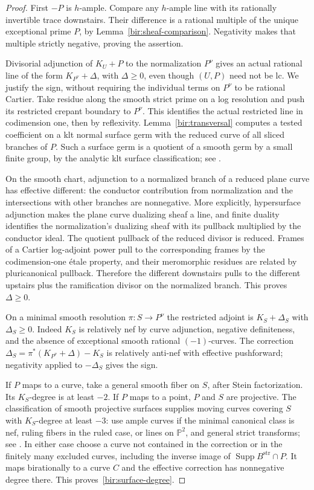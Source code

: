 \documentclass[11pt,letterpaper]{article}
\theoremstyle{definition}
\theoremstyle{remark}
\begin{document}
\begin{proof}
First $-P$ is $h$-ample.  Compare any $h$-ample line with its
rationally invertible trace downstairs.  Their difference is a
rational multiple of the unique exceptional prime $P$, by
Lemma~\ref{bir:sheaf-comparison}.  Negativity makes that multiple
strictly negative, proving the assertion.

Divisorial adjunction of $K_U+P$ to the normalization $P^\nu$ gives
an actual rational line of the form $K_{P^\nu}+\Delta$, with
$\Delta\geq0$, even though $(U,P)$ need not be lc.  We justify the
sign, without requiring the individual terms on $P^\nu$ to be
rational Cartier.  Take residue along the smooth strict prime on a
log resolution and push its restricted crepant boundary to $P^\nu$.
This identifies the actual restricted line in codimension one, then
by reflexivity.  Lemma~\ref{bir:transversal} computes a tested
coefficient on a klt normal surface germ with the reduced curve of
all sliced branches of $P$.  Such a surface germ is a quotient of a
smooth germ by a small finite group, by the analytic klt surface
classification; see \cite[Chapter~4]{BirationalGeometry}.

On the smooth chart, adjunction to a normalized branch of a reduced
plane curve has effective different: the conductor contribution
from normalization and the intersections with other branches are
nonnegative.  More explicitly, hypersurface adjunction makes the
plane curve dualizing sheaf a line, and finite duality identifies the
normalization's dualizing sheaf with its pullback multiplied by the
conductor ideal.  The quotient pullback of the reduced divisor is
reduced.  Frames of a Cartier log-adjoint power pull to the
corresponding frames by the codimension-one \mbox{\'etale} property,
and their meromorphic residues are related by pluricanonical
pullback.  Therefore the different downstairs pulls to the
different upstairs plus the ramification divisor on the normalized
branch.  This proves $\Delta\geq0$.

On a minimal smooth resolution $\pi:S\to P^\nu$ the restricted
adjoint is $K_S+\Delta_S$ with $\Delta_S\geq0$.  Indeed $K_S$ is
relatively nef by curve adjunction, negative definiteness, and the
absence of exceptional smooth rational $(-1)$-curves.  The correction
$\Delta_S=\pi^*(K_{P^\nu}+\Delta)-K_S$ is relatively anti-nef with
effective pushforward; negativity applied to $-\Delta_S$ gives the
sign.

If $P$ maps to a curve, take a general smooth fiber on $S$, after
Stein factorization.  Its $K_S$-degree is at least $-2$.  If $P$ maps
to a point, $P$ and $S$ are projective.  The classification of smooth
projective surfaces supplies moving curves covering $S$ with
$K_S$-degree at least $-3$: use ample curves if the minimal canonical
class is nef, ruling fibers in the ruled case, or lines on $\mathbb{P}^2$,
and general strict transforms; see \cite{BHPV}.  In either case
choose a curve not contained in the correction or in the finitely
many excluded curves, including the inverse image of
$\operatorname{Supp} B^{\mathrm{str}}\cap P$.  It maps birationally to a curve $C$
and the effective correction has nonnegative degree there.  This
proves~\eqref{bir:surface-degree}.
\end{proof}
\end{document}
